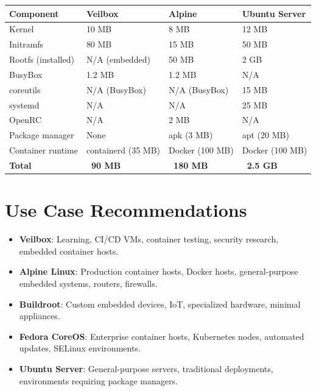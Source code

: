 \begin{longtable}{|p{4cm}|p{3cm}|p{3cm}|p{3cm}|}
\hline
\textbf{Component} & \textbf{Veilbox} & \textbf{Alpine} & \textbf{Ubuntu Server} \\
\hline
Kernel & 10 MB & 8 MB & 12 MB \\
Initramfs & 80 MB & 15 MB & 50 MB \\
Rootfs (installed) & N/A (embedded) & 50 MB & 2 GB \\
BusyBox & 1.2 MB & 1.2 MB & N/A \\
coreutils & N/A (BusyBox) & N/A (BusyBox) & 15 MB \\
systemd & N/A & N/A & 25 MB \\
OpenRC & N/A & 2 MB & N/A \\
Package manager & None & apk (3 MB) & apt (20 MB) \\
Container runtime & containerd (35 MB) & Docker (100 MB) & Docker (100 MB) \\
\hline
\textbf{Total} & \textbf{~90 MB} & \textbf{~180 MB} & \textbf{~2.5 GB} \\
\hline
\end{longtable}

\section{Use Case Recommendations}

\begin{itemize}[nosep]
  \item \textbf{Veilbox}: Learning, CI/CD VMs, container testing,
        security research, embedded container hosts.
  \item \textbf{Alpine Linux}: Production container hosts, Docker hosts,
        general-purpose embedded systems, routers, firewalls.
  \item \textbf{Buildroot}: Custom embedded devices, IoT, specialized
        hardware, minimal appliances.
  \item \textbf{Fedora CoreOS}: Enterprise container hosts, Kubernetes
        nodes, automated updates, SELinux environments.
  \item \textbf{Ubuntu Server}: General-purpose servers, traditional
        deployments, environments requiring package managers.
\end{itemize}
